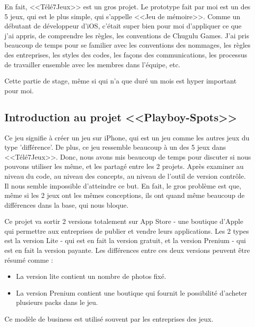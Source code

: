 En fait, <<Télé7Jeux>> est un gros projet. Le prototype fait par moi est un des 5 jeux, qui est le plus simple, qui s'appelle <<Jeu de mémoire>>. Comme un débutant de développeur d'iOS, c'était super bien pour moi d'appliquer ce que j'ai appris, de comprendre les règles, les conventions de Chugulu Games. J'ai pris beaucoup de temps pour se familier avec les conventions des nommages, les règles des entreprises, les styles des codes, les façons des communications, les processus de travailler ensemble avec les membres dans l'équipe, etc. 

Cette partie de stage, même si qui n'a que duré un mois est hyper important pour moi.


\subsection{Introduction au projet <<Playboy-Spots>>} %


Ce jeu signifie à créer un jeu sur iPhone, qui est un jeu comme les autres jeux du type 'différence'. De plus, ce jeu ressemble beaucoup à un des 5 jeux dans <<Télé7Jeux>>. Donc, nous avons mis beaucoup de temps pour discuter si nous pouvons utiliser les même, et les partagé entre les 2 projets. Après examiner au niveau du code, au niveau des concepts, au niveau de l'outil de version contrôle. Il nous semble impossible d'atteindre ce but. En fait, le gros problème est que, même si les 2 jeux ont les mêmes conceptions, ils ont quand même beaucoup de différences dans la base, qui nous bloque.

Ce projet va sortir 2 versions totalement sur App Store - une boutique d'Apple qui permettre aux entreprises de publier et vendre leurs applications. Les 2 types est la version Lite - qui est en fait la version gratuit, et la version Prenium - qui est en fait la version payante. Les différences entre ces deux versions peuvent être résumé comme :  \begin{itemize}  \item La version lite contient un nombre de photos fixé. 

\item La version Prenium contient une boutique qui fournit le possibilité d'acheter plusieurs packs dans le jeu. 
\end{itemize}
Ce modèle de business est utilisé souvent par les entreprises des jeux. 

